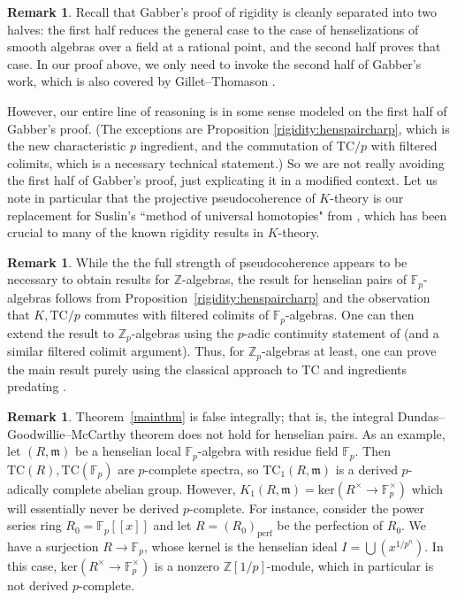 \documentclass{amsart}
\theoremstyle{definition}
\newtheorem{remark}[definition]{Remark}
\newcommand{\TC}{\mathrm{TC}}
\begin{document}
\begin{remark}
Recall that Gabber's proof \cite{gabber} of rigidity is cleanly separated into two halves: the
first half reduces the general case to the case of henselizations of smooth
algebras over a field at a rational point, and the second half proves that case.
In our proof above, we only need to invoke the second half of Gabber's work,
which is also covered by Gillet--Thomason \cite{GT}.

However, our entire line of reasoning is in some sense modeled on the first half
of Gabber's proof. (The exceptions are Proposition \ref{rigidity:henspaircharp},
which is the new characteristic $p$ ingredient, and the commutation of $\TC/p$
with filtered colimits, which is a necessary technical statement.)  So we are
not really avoiding the first half of Gabber's proof, just explicating it in a
modified context.  Let us note in particular that the projective
pseudocoherence of $K$-theory is our replacement for Suslin's ``method of
universal homotopies" from \cite{Suslinlocal}, which has been crucial to many of the known
rigidity results in $K$-theory.
\end{remark}

\begin{remark} 
\label{rem:fpcaseeasier}
While the 
the full strength of pseudocoherence appears to be necessary to obtain results
for $\mathbb{Z}$-algebras, the result for henselian pairs of $\mathbb{F}_p$-algebras 
follows from Proposition~\ref{rigidity:henspaircharp} and the observation that
$K, \TC/p$ commutes with filtered colimits of $\mathbb{F}_p$-algebras. 
One can then extend the result to $\mathbb{Z}_p$-algebras using the $p$-adic
continuity statement of \cite{GHlocal} (and a similar filtered colimit
argument). Thus, for $\mathbb{Z}_p$-algebras at least, one can prove the main
result purely using the classical approach to $\TC$ and ingredients predating
\cite{nikolaus-scholze}.  
\end{remark} 

\begin{remark} 
Theorem~\ref{mainthm} is false integrally; that is, the integral
Dundas--Goodwillie--McCarthy theorem does not hold for henselian pairs. 
As an example, 
let $(R, \mathfrak{m})$ be a henselian local $\mathbb{F}_p$-algebra with
residue field $\mathbb{F}_p$. 
Then $\TC(R), \TC(\mathbb{F}_p)$ are $p$-complete spectra, so 
$\TC_1(R, \mathfrak{m})$ is a derived $p$-adically complete abelian group. 
However, $K_1(R, \mathfrak{m}) =\mathrm{ker}(R^{\times} \to
\mathbb{F}_p^{\times})$ which will essentially never be derived $p$-complete. 
For instance, consider the power series ring $R_0 =  \mathbb{F}_p[[x]]$ and let
$R = (R_0)_{\mathrm{perf}}$ be the perfection of $R_0$. 
We have a surjection $R \to \mathbb{F}_p$, whose kernel is the henselian ideal
$I = \bigcup (x^{1/p^n})$. 
In this case, $\mathrm{ker}(R^{\times} \to \mathbb{F}_p^{\times})$ is a
nonzero
$\mathbb{Z}[1/p]$-module, which in particular is not derived $p$-complete. 
\end{remark} 
\end{document}
